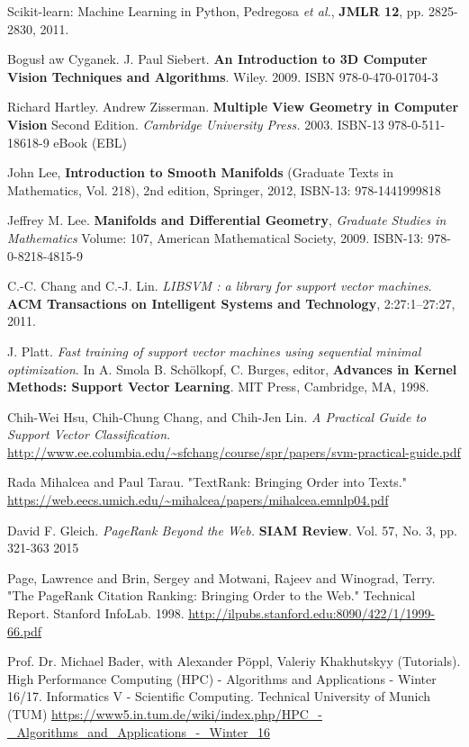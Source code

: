 \documentclass[10pt]{amsart}
\begin{document}
\begin{thebibliography}{9}
  Scikit-learn: Machine Learning in Python, Pedregosa \emph{et al.}, \textbf{JMLR 12}, pp. 2825-2830, 2011.


Bogus\l{} aw Cyganek.  J. Paul Siebert.  \textbf{An Introduction to 3D Computer Vision Techniques and Algorithms}.  Wiley.  2009.  ISBN 978-0-470-01704-3

Richard Hartley.  Andrew Zisserman.  \textbf{Multiple View Geometry in Computer Vision}  Second Edition.  \emph{Cambridge University Press.}  2003.  ISBN-13 978-0-511-18618-9 eBook (EBL)

John Lee, \textbf{Introduction to Smooth Manifolds} (Graduate Texts in Mathematics, Vol. 218), 2nd edition, Springer,  2012, ISBN-13: 978-1441999818

Jeffrey M. Lee. \textbf{Manifolds and Differential Geometry}, \emph{Graduate Studies in Mathematics} Volume: 107, American Mathematical Society, 2009. ISBN-13: 978-0-8218-4815-9



  C.-C. Chang and C.-J. Lin. \emph{LIBSVM : a library for support vector machines}. \textbf{ACM Transactions on Intelligent Systems and Technology}, 2:27:1--27:27, 2011. 

  J. Platt. \emph{Fast training of support vector machines using sequential minimal optimization}. In A. Smola B. Schölkopf, C. Burges, editor, \textbf{Advances in Kernel Methods: Support Vector Learning}. MIT Press, Cambridge, MA, 1998.

Chih-Wei Hsu, Chih-Chung Chang, and Chih-Jen Lin.  \emph{A Practical Guide to Support Vector Classification}.  \url{http://www.ee.columbia.edu/~sfchang/course/spr/papers/svm-practical-guide.pdf}

Rada Mihalcea and Paul Tarau.  "TextRank: Bringing Order into Texts."  
\url{https://web.eecs.umich.edu/~mihalcea/papers/mihalcea.emnlp04.pdf}  

David F. Gleich.  \emph{PageRank Beyond the Web.}  \textbf{SIAM Review}.  Vol. 57, No. 3, pp. 321-363 2015  
  
Page, Lawrence and Brin, Sergey and Motwani, Rajeev and Winograd, Terry.  "The PageRank Citation Ranking: Bringing Order to the Web." Technical Report. Stanford InfoLab.  1998.  \url{http://ilpubs.stanford.edu:8090/422/1/1999-66.pdf}  
  
Prof. Dr. Michael Bader, with Alexander P\"{o}ppl, Valeriy Khakhutskyy (Tutorials).  High Performance Computing (HPC) - Algorithms and Applications - Winter 16/17.  Informatics V - Scientific Computing.  Technical University of Munich (TUM)
\url{https://www5.in.tum.de/wiki/index.php/HPC_-_Algorithms_and_Applications_-_Winter_16}



\end{thebibliography}
\end{document}
